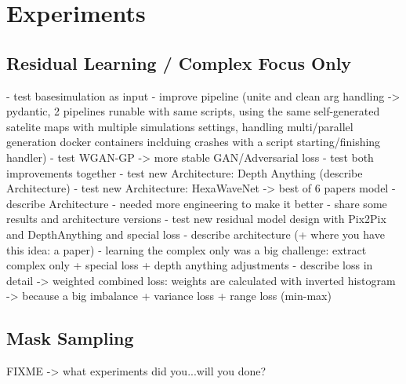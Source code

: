 \chapter{Experiments}
\label{cha:experiments}



	\section{Residual Learning / Complex Focus Only}
	\label{sec:experiments-cfo}
		- test basesimulation as input
			- improve pipeline (unite and clean arg handling -> pydantic, 2 pipelines runable with same scripts, using the same self-generated satelite maps with multiple simulations settings, handling multi/parallel generation docker containers inclduing crashes with a script starting/finishing handler)
		- test WGAN-GP -> more stable GAN/Adversarial loss
		- test both improvements together
		- test new Architecture: Depth Anything (describe Architecture)
		- test new Architecture: HexaWaveNet -> best of 6 papers model
			- describe Architecture
			- needed more engineering to make it better
			- share some results and architecture versions
		- test new residual model design with Pix2Pix and DepthAnything and special loss
			- describe architecture (+ where you have this idea: a paper)
			- learning the complex only was a big challenge: extract complex only + special loss + depth anything adjustments
			- describe loss in detail -> weighted combined loss: weights are calculated with inverted histogram -> because a big imbalance + variance loss + range loss (min-max)
	
	\section{Mask Sampling}
	\label{sec:experiments-masking}
		FIXME -> what experiments did you...will you done?
	
	

